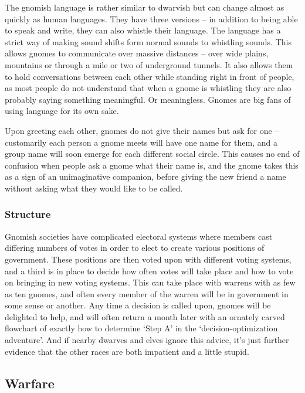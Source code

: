 \begin{multicols}{2}
The gnomish language is rather similar to dwarvish but can change almost as quickly as human languages.
They have three versions -- in addition to being able to speak and write, they can also whistle their language.
The language has a strict way of making sound shifts form normal sounds to whistling sounds.
This allows gnomes to communicate over massive distances -- over wide plains, mountains or through a mile or two of underground tunnels.
It also allows them to hold conversations between each other while standing right in front of people, as most people do not understand that when a gnome is whistling they are also probably saying something meaningful.
Or meaningless.
Gnomes are big fans of using language for its own sake. 

Upon greeting each other, gnomes do not give their names but ask for one -- customarily each person a gnome meets will have one name for them, and a group name will soon emerge for each different social circle. This causes no end of confusion when people ask a gnome what their name is, and the gnome takes this as a sign of an unimaginative companion, before giving the new friend a name without asking what they would like to be called.

\subsubsection{Structure}
Gnomish societies have complicated electoral systems where members cast differing numbers of votes in order to elect to create various positions of government.
These positions are then voted upon with different voting systems, and a third is in place to decide how often votes will take place and how to vote on bringing in new voting systems.
This can take place with warrens with as few as ten gnomes, and often every member of the warren will be in government in some sense or another.
Any time a decision is called upon, gnomes will be delighted to help, and will often return a month later with an ornately carved flowchart of exactly how to determine `Step A' in the `decision-optimization adventure'.
And if nearby dwarves and elves ignore this advice, it's just further evidence that the other races are both impatient and a little stupid.

\subsection{Warfare}


\end{multicols}
